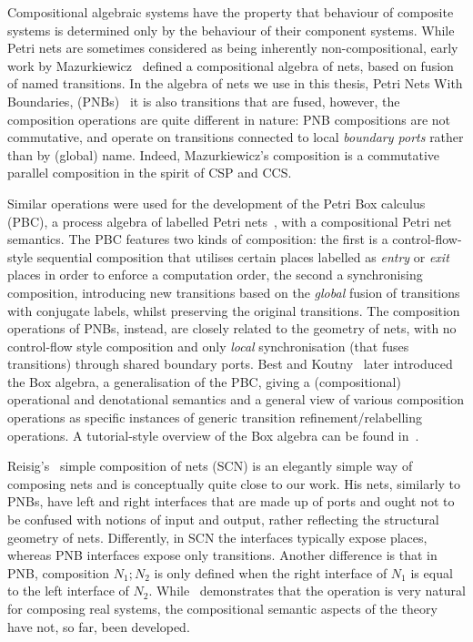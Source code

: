 Compositional algebraic systems have the property that behaviour of composite
systems is determined only by the behaviour of their component systems.  While
Petri nets are sometimes considered as being inherently non-compositional,
early work by Mazurkiewicz~\cite{Mazurkiewicz1988} defined a compositional
algebra of nets, based on fusion of named transitions. In the algebra of nets
we use in this thesis, Petri Nets With Boundaries,
(PNBs)~\cite{Sobocinski2010,Bruni2013} it is also transitions that are fused,
however, the composition operations are quite different in nature: PNB
compositions are not commutative, and operate on transitions connected to local
\emph{boundary ports} rather than by (global) name. Indeed, Mazurkiewicz's
composition is a commutative parallel composition in the spirit of CSP and CCS.

Similar operations were used for the development of the Petri Box calculus
(PBC), a process algebra of labelled Petri nets~\cite{Best1992}, with a
compositional Petri net semantics. The PBC features two kinds of composition:
the first is a control-flow-style sequential composition that utilises certain
places labelled as \emph{entry} or \emph{exit} places in order to enforce a
computation order, the second a synchronising composition, introducing new
transitions based on the \emph{global} fusion of transitions with conjugate
labels, whilst preserving the original transitions. The composition operations
of PNBs, instead, are closely related to the geometry of nets, with no
control-flow style composition and only \emph{local} synchronisation (that
fuses transitions) through shared boundary ports. {Best and
Koutny}~\cite{Koutny1999} later introduced the Box algebra, a generalisation of
the PBC, giving a (compositional) operational and denotational semantics and a
general view of various composition operations as specific instances of generic
transition refinement/relabelling operations. A tutorial-style
overview of the Box algebra can be found in~\cite{Best1995}.

Reisig's~\cite{Reisig2009} simple composition of nets (SCN) is an
elegantly simple way of composing nets and is conceptually quite close to our
work. His nets, similarly to PNBs, have left and right interfaces that are made
up of ports and ought not to be confused with notions of input and output,
rather reflecting the structural geometry of nets. Differently, in SCN the
interfaces typically expose places, whereas PNB interfaces expose only
transitions. Another difference is that in PNB, composition $N_1\mathrel{;}N_2$
is only defined when the right interface of $N_1$ is equal to the left
interface of $N_2$. While~\cite{Reisig2009} demonstrates that the operation is
very natural for composing real systems, the compositional semantic aspects of
the theory have not, so far, been developed.

